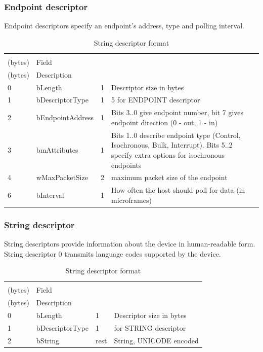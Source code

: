 \documentclass{article}
\begin{document}
\subsubsection{Endpoint descriptor}

Endpoint descriptors specify an endpoint's address, type and polling interval.

\begin{table}[H]
  \caption{String descriptor format \cite[p. 269ff.]{usbstd}}
  \centering
  \begin{tabularx}{\textwidth}{l | l | l | X}
    \begin{tabular}{@{}l} Offset \\ (bytes) \end{tabular} & Field &
    \begin{tabular}{@{}l} Size \\ (bytes) \end{tabular} & Description \\ \hline
    0 & bLength & 1 & Descriptor size in bytes \\
    1 & bDescriptorType & 1 & 5 for ENDPOINT descriptor \\
    2 & bEndpointAddress & 1 & Bits 3..0 give endpoint number, bit 7 gives endpoint direction
        (0 - out, 1 - in) \\
    3 & bmAttributes & 1 & Bits 1..0 describe endpoint type (Control, Isochronous, Bulk, Interrupt).
        Bits 5..2 specify extra options for isochronous endpoints \\
    4 & wMaxPacketSize & 2 & maximum packet size of the endpoint \\
    6 & bInterval & 1 & How often the host should poll for data (in microframes)
  \end{tabularx}
\end{table}

\subsubsection{String descriptor}

String descriptors provide information about the device in human-readable form.
String descriptor 0 transmits language codes supported by the device.

\begin{table}[H]
  \caption{String descriptor format \cite[p. 273f.]{usbstd}}
  \centering
  \begin{tabularx}{\textwidth}{l | l | l | X}
    \begin{tabular}{@{}l} Offset \\ (bytes) \end{tabular} & Field &
    \begin{tabular}{@{}l} Size \\ (bytes) \end{tabular} & Description \\ \hline
    0 & bLength & 1 & Descriptor size in bytes \\
    1 & bDescriptorType & 1 & for STRING descriptor \\
    2 & bString & rest & String, UNICODE encoded
  \end{tabularx}
\end{table}
\end{document}
